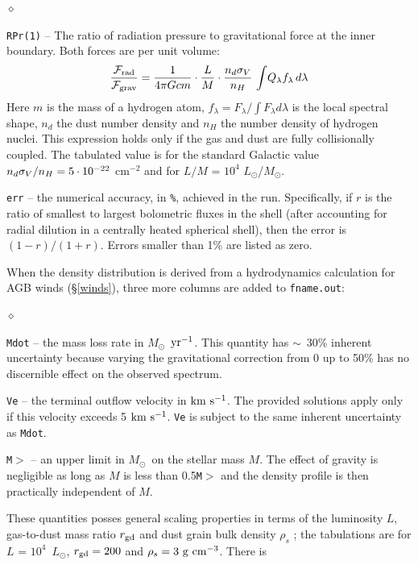 \documentclass[11pt]{article}
\def\E#1{\hbox{$10^{#1}$}}
\def\eq#1{\begin{equation} #1 \end{equation}}
\def\about  {\hbox{$\sim$}}
\def\Mo     {\hbox{$M_{\odot}$}}
\def\Lo     {\hbox{$L_{\odot}$}}
\def\kms    {\hbox{$\rm km\ s^{-1}$}}
\def\sub#1{_{\rm #1}}
\def\Frad {\hbox{${\cal F}\sub{rad}$}}
\def\Fgrav{\hbox{${\cal F}\sub{grav}$}}
\begin{document}
\begin{list}{$\diamond$}{}
\item {\tt RPr(1)} -- The ratio of radiation pressure to gravitational
  force at the inner boundary. Both forces are per unit volume: \eq{
    {\Frad\over\Fgrav} = {1\over4\pi Gcm} \cdot{L\over
      M}\cdot{n_d\sigma_V\over n_H}\, \int\!Q_\lambda
    f_\lambda\,d\lambda } Here $m$ is the mass of a hydrogen atom,
  $f_\lambda = F_\lambda/\int F_\lambda d\lambda$ is the local
  spectral shape, $n_d$ the dust number density and $n_H$ the number
  density of hydrogen nuclei.  This expression holds only if the gas
  and dust are fully collisionally coupled. The tabulated value is for
  the standard Galactic value $n_d\sigma_V/n_H = 5\cdot\E{-22}$
  cm$^{-2}$ and for $L/M$ = \E4 \Lo/\Mo.

\item {\tt err} -- the numerical accuracy, in {\tt \%}, achieved in
  the run.  Specifically, if $r$ is the ratio of smallest to largest
  bolometric fluxes in the shell (after accounting for radial dilution
  in a centrally heated spherical shell), then the error is $(1 -
  r)/(1 + r)$. Errors smaller than 1\% are listed as zero.

\end{list}
When the density distribution is derived from a hydrodynamics
calculation for AGB winds (\S\ref{winds}), three more columns are
added to {\tt fname.out}:
\begin{list}{$\diamond$}{}
\item {\tt Mdot} -- the mass loss rate in \Mo\ $\rm yr^{-1}$.  This
  quantity has \about\ 30\% inherent uncertainty because varying the
  gravitational correction from 0 up to 50\% has no discernible effect
  on the observed spectrum.

\item {\tt Ve} -- the terminal outflow velocity in \kms. The provided
  solutions apply only if this velocity exceeds 5 \kms.  {\tt Ve} is
  subject to the same inherent uncertainty as {\tt Mdot}.
\item {\tt M$>$} -- an upper limit in \Mo\ on the stellar mass $M$.
  The effect of gravity is negligible as long as $M$ is less than
  0.5{\tt *M$>$} and the density profile is then practically
  independent of $M$.

\end{list}
These quantities posses general scaling properties in terms of the
luminosity $L$, gas-to-dust mass ratio $r_{\rm gd}$ and dust grain
bulk density $\rho_s$ \cite{EI01, IE10}; the tabulations are for $L$ =
\E4\ \Lo, $r_{\rm gd} = 200$ and $\rho_s = 3\ \rm g~cm^{-3}$. There is
\end{document}
